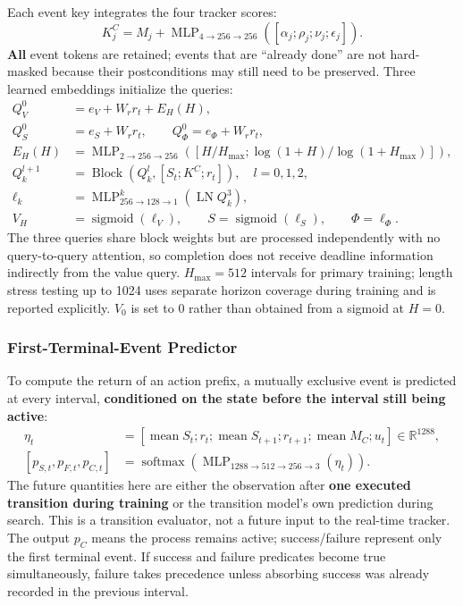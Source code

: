 \documentclass[
  10pt,
]{article}
\begin{document}
Each event key integrates the four tracker scores:
\begin{equation}\label{eq:valuekeys}
K_j^C=M_j+\operatorname{MLP}_{4\to256\to256}([\alpha_j;\rho_j;\nu_j;\epsilon_j]).
\end{equation}
\textbf{All} event tokens are retained; events that are ``already done'' are not hard-masked because their postconditions may still need to be preserved. Three learned embeddings initialize the queries:
\begin{equation}\label{eq:valueforward}
\begin{aligned}
Q_V^0&=e_V+W_rr_t+E_H(H),\\
Q_S^0&=e_S+W_rr_t,\qquad Q_\Phi^0=e_\Phi+W_rr_t,\\
E_H(H)&=\operatorname{MLP}_{2\to256\to256}([H/H_{\max};\log(1+H)/\log(1+H_{\max})]),\\
Q_k^{l+1}&=\operatorname{Block}(Q_k^l,[S_t;K^C;r_t]),\quad l=0,1,2,\\
\ell_k&=\operatorname{MLP}^k_{256\to128\to1}(\operatorname{LN}Q_k^3),\\
V_H&=\operatorname{sigmoid}(\ell_V),\qquad S=\operatorname{sigmoid}(\ell_S),\qquad\Phi=\ell_\Phi.
\end{aligned}
\end{equation}
The three queries share block weights but are processed independently with no query-to-query attention, so completion does not receive deadline information indirectly from the value query. \(H_{\max}=512\) intervals for primary training; length stress testing up to 1024 uses separate horizon coverage during training and is reported explicitly. \(V_0\) is set to 0 rather than obtained from a sigmoid at \(H=0\).

\hypertarget{first-terminal-event-predictor}{%
\subsubsection{First-Terminal-Event Predictor}\label{first-terminal-event-predictor}}

To compute the return of an action prefix, a mutually exclusive event is predicted at every interval, \textbf{conditioned on the state before the interval still being active}:
\begin{equation}\label{eq:hazard}
\begin{aligned}
\eta_t&=[\operatorname{mean}S_t;r_t;\operatorname{mean}S_{t+1};r_{t+1};\operatorname{mean}M_C;u_t]\in\mathbb R^{1288},\\
[p_{S,t},p_{F,t},p_{C,t}]
&=\operatorname{softmax}(\operatorname{MLP}_{1288\to512\to256\to3}(\eta_t)).
\end{aligned}
\end{equation}
The future quantities here are either the observation after \textbf{one executed transition during training} or the transition model's own prediction during search. This is a transition evaluator, not a future input to the real-time tracker. The output \(p_C\) means the process remains active; success/failure represent only the first terminal event. If success and failure predicates become true simultaneously, failure takes precedence unless absorbing success was already recorded in the previous interval.
\end{document}
